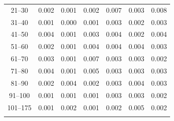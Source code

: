\begin{table}
\begin{tabular}{ccccccc}
21--30 & 0.002 & 0.001 & 0.002 & 0.007 & 0.003 & 0.008\\
31--40 & 0.001 & 0.000 & 0.001 & 0.003 & 0.002 & 0.003\\
41--50 & 0.004 & 0.001 & 0.003 & 0.004 & 0.002 & 0.004\\
51--60 & 0.002 & 0.001 & 0.004 & 0.004 & 0.004 & 0.003\\
61--70 & 0.003 & 0.001 & 0.007 & 0.003 & 0.003 & 0.002\\
71--80 & 0.004 & 0.001 & 0.005 & 0.003 & 0.003 & 0.003\\
81--90 & 0.002 & 0.004 & 0.002 & 0.003 & 0.004 & 0.003\\
91--100 & 0.001 & 0.001 & 0.001 & 0.003 & 0.003 & 0.002\\
101--175 & 0.001 &  0.002 & 0.001 & 0.002 &  0.005 & 0.002\\
\noalign{\smallskip}\hline
\end{tabular}
\end{table}





%
%



